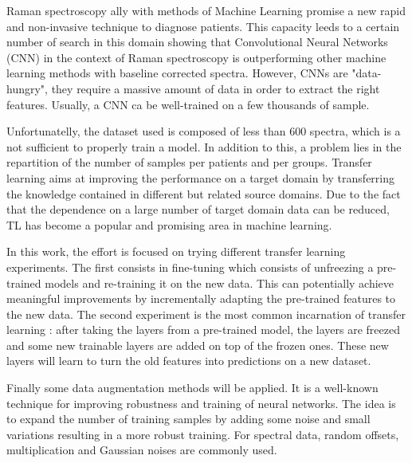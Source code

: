 Raman spectroscopy ally with methods of Machine Learning promise a new rapid and non-invasive technique to diagnose patients. This capacity leeds to a certain number of search in this domain showing that Convolutional Neural Networks (CNN) in the context of Raman spectroscopy is outperforming other machine learning methods with baseline corrected spectra. However, CNNs are "data-hungry", they require a massive amount of data in order to extract the right features. Usually, a CNN ca be well-trained on a few thousands of sample. 

Unfortunatelly, the dataset used is composed of less than 600 spectra, which is a not sufficient to properly train a model. In addition to this, a problem lies in the repartition of the number of samples per patients and per groups. Transfer learning aims at improving the performance on a target domain by transferring the knowledge contained in different but related source domains. Due to the fact that the dependence on a large number of target domain data can be reduced, TL has become a popular and promising area in machine learning.

In this work, the effort is focused on trying different transfer learning experiments. The first consists in fine-tuning which consists of unfreezing a pre-trained models and re-training it on the new data. This can potentially achieve meaningful improvements by incrementally adapting the pre-trained features to the new data. The second experiment is the most common incarnation of transfer learning : after taking the layers from a pre-trained model, the layers are freezed and some new trainable layers are added on top of the frozen ones. These new layers will learn to turn the old features into predictions on a new dataset.

Finally some data augmentation methods will be applied. It is a well-known technique for improving robustness and training of neural networks. The idea is to expand the number of training samples by adding some noise and small variations resulting in a more robust training. For spectral data, random offsets, multiplication and Gaussian noises are commonly used.

	
